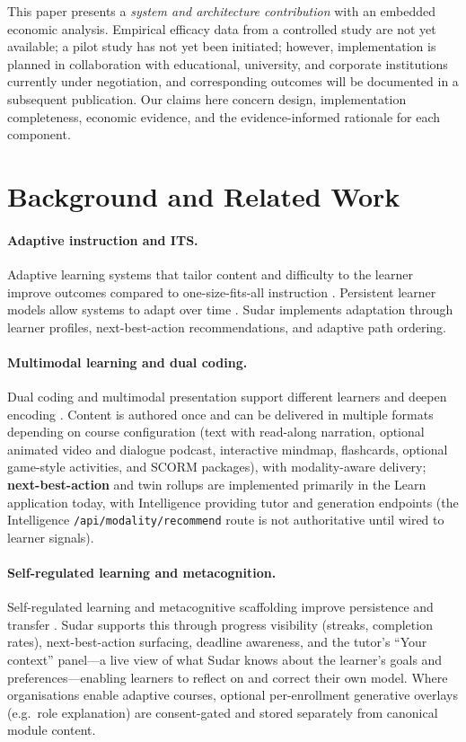 \documentclass[10pt,twocolumn]{article}
\begin{document}
This paper presents a \emph{system and architecture contribution} with
an embedded economic analysis. Empirical efficacy data from a
controlled study are not yet available; a pilot study has not yet been
initiated; however, implementation is planned in collaboration with
educational, university, and corporate institutions currently under
negotiation, and corresponding outcomes will be documented in a
subsequent publication. Our claims here concern design, implementation
completeness, economic evidence, and the evidence-informed rationale
for each component.

\section{Background and Related Work}
\label{sec:related}

\paragraph{Adaptive instruction and ITS.}
Adaptive learning systems that tailor content and difficulty to the
learner improve outcomes compared to one-size-fits-all instruction
\cite{vanlehn2011,aleven2016}. Persistent learner models allow systems
to adapt over time \cite{self1988,bull2016}. Sudar implements
adaptation through learner profiles, next-best-action recommendations,
and adaptive path ordering.

\paragraph{Multimodal learning and dual coding.}
Dual coding and multimodal presentation support different learners and
deepen encoding \cite{mayer2009,clark2016}. Content is authored once
and can be delivered in multiple formats depending on course
configuration (text with read-along narration, optional animated video
and dialogue podcast, interactive mindmap, flashcards, optional
game-style activities, and SCORM packages), with modality-aware delivery; \textbf{next-best-action} and twin
rollups are implemented primarily in the Learn application today, with
Intelligence providing tutor and generation endpoints (the Intelligence
\texttt{/api/modality/recommend} route is not authoritative until wired
to learner signals).

\paragraph{Self-regulated learning and metacognition.}
Self-regulated learning and metacognitive scaffolding improve
persistence and transfer \cite{zimmerman2002}. Sudar supports this
through progress visibility (streaks, completion rates), next-best-action
surfacing, deadline awareness, and the tutor's ``Your context'' panel---a
live view of what Sudar knows about the learner's goals and
preferences---enabling learners to reflect on and correct their own
model. Where organisations enable adaptive courses, optional
per-enrollment generative overlays (e.g.\ role explanation) are
consent-gated and stored separately from canonical module content.
\end{document}

